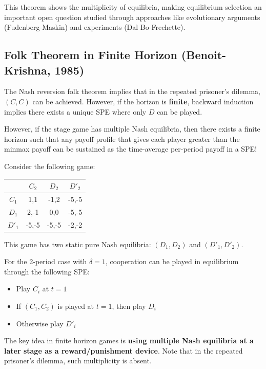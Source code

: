 \documentclass[11pt]{elegantbook_2}
\begin{document}
This theorem shows the multiplicity of equilibria, making equilibrium selection an important open question studied through approaches like evolutionary arguments (Fudenberg-Maskin) and experiments (Dal Bo-Frechette).

\subsection{Folk Theorem in Finite Horizon (Benoit-Krishna, 1985)}
\begin{remark}
    The Nash reversion folk theorem implies that in the repeated prisoner's dilemma, $(C,C)$ can be achieved. However, if the horizon is \textbf{finite}, backward induction implies there exists a unique SPE where only $D$ can be played.
\end{remark}

However, if the stage game has multiple Nash equilibria, then there exists a finite horizon such that any payoff profile that gives each player greater than the minmax payoff can be sustained as the time-average per-period payoff in a SPE!

Consider the following game:
\begin{center}
    \begin{tabular}{cccc}
        \hline
            &$C_2$ &$D_2$ &$D'_2$\\
        \hline
            $C_1$& 1,1 & -1,2 & -5,-5\\
            $D_1$& 2,-1 & 0,0 & -5,-5\\
            $D'_1$& -5,-5 & -5,-5 & -2,-2\\
        \hline
    \end{tabular}
\end{center}

This game has two static pure Nash equilibria: $(D_1,D_2)$ and $(D'_1,D'_2)$.

For the 2-period case with $\delta=1$, cooperation can be played in equilibrium through the following SPE:
\begin{itemize}
    \item Play $C_i$ at $t=1$
    \item If $(C_1,C_2)$ is played at $t=1$, then play $D_i$
    \item Otherwise play $D'_i$
\end{itemize}

The key idea in finite horizon games is \textbf{using multiple Nash equilibria at a later stage as a reward/punishment device}. Note that in the repeated prisoner's dilemma, such multiplicity is absent.
\end{document}
